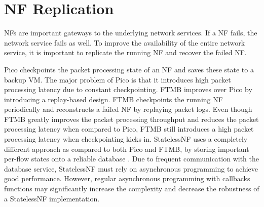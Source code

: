 \section{NF Replication}

NFs are important gateways to the underlying network services. If a NF fails, the network service fails as well. To improve the availability of the entire network service, it is important to replicate the running NF and recover the failed NF.

Pico \cite{rajagopalan2013pico} checkpoints the packet processing state of an NF and saves these state to a backup VM. The major problem of Pico is that it introduces high packet processing latency due to constant checkpointing. FTMB \cite{sherry2015rollback} improves over Pico by introducing a replay-based design. FTMB checkpoints the running NF periodically and reconstructs a failed NF by replaying packet logs. Even though FTMB greatly improves the packet processing throughput and reduces the packet processing latency when compared to Pico, FTMB still introduces a high packet processing latency when checkpointing kicks in. StatelessNF \cite{201545} uses a completely different approach as compared to both Pico and FTMB, by storing important per-flow states onto a reliable database \cite{ongaro2011fast}. Due to frequent communication with the database service, StatelessNF must rely on asynchronous programming to achieve good performance. However, regular asynchronous programming with callbacks functions may significantly increase the complexity and decrease the robustness of a StatelessNF implementation.




